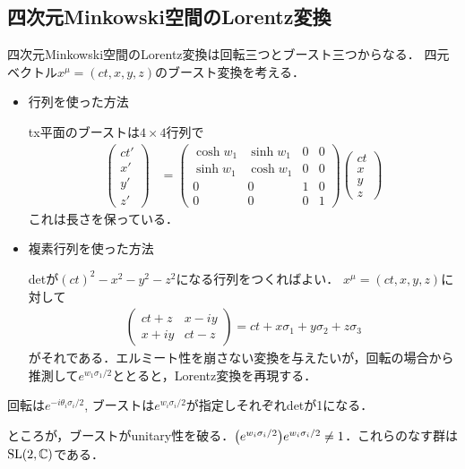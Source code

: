 \subsection{四次元Minkowski空間のLorentz変換}
四次元Minkowski空間のLorentz変換は回転三つとブースト三つからなる．
四元ベクトル$x^{\mu} = (ct, x, y, z) $のブースト変換を考える．
\begin{itemize}
		\item 行列を使った方法

				tx平面のブーストは$4\times 4$行列で
				\begin{align}
						\begin{pmatrix}
								ct'\\
								x'\\
								y'\\
								z'
						\end{pmatrix}
						&=
						\begin{pmatrix}
								\cosh w_1 & \sinh w_1 & 0 & 0\\
								\sinh w_1 & \cosh w_1 & 0 & 0\\
								0 & 0 & 1 & 0\\
								0 & 0 & 0 & 1
						\end{pmatrix}
						\begin{pmatrix}
								ct\\
								x\\
								y\\
								z
						\end{pmatrix}
				\end{align}
				これは長さを保っている．
		\item 複素行列を使った方法

				detが$(ct)^2 - x^2 - y^2 - z^2$になる行列をつくればよい．
				$x^{\mu} = (ct, x, y, z)$に対して
				\begin{align}
						\begin{pmatrix}
								ct + z & x - iy\\
								x + iy & ct - z
						\end{pmatrix}
						= ct  + x\sigma_1 + y\sigma_2 + z\sigma_3
				\end{align}
				がそれである．エルミート性を崩さない変換を与えたいが，回転の場合から推測して$e^{w_1\sigma_1/2}$ととると，Lorentz変換を再現する．
\end{itemize}

回転は$e^{-i\theta_i\sigma_i/2}$, ブーストは$e^{w_i\sigma_i/2}$が指定しそれぞれdetが1になる．


ところが，ブーストがunitary性を破る．$\qty(e^{w_i\sigma_i/2})e^{w_i\sigma_i/2} \neq 1$．これらのなす群は$\mathrm{SL}(2, \mathbb{C})$である．

